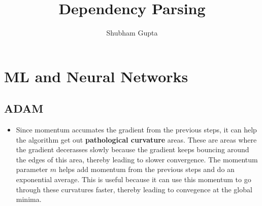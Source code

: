 \documentclass[a4paper]{article}
\title{Dependency Parsing}
\author{Shubham Gupta}
\begin{document}
\maketitle
\section{ML and Neural Networks}
\subsection{ADAM}
\begin{itemize}
    \item Since momentum accumates the gradient from the previous steps, it can help the algorithm get out  \textbf{pathological curvature} areas. These are areas where the gradient decerasses slowly because the gradient keeps bouncing around the edges of this area, thereby leading to slower convergence. The momentum parameter $m$ helps add momentum from the previous steps and do an exponential average. This is useful because it can use this momentum to go through these curvatures faster,
        thereby leading to convegence at the global minima.
\end{itemize}
\end{document}
